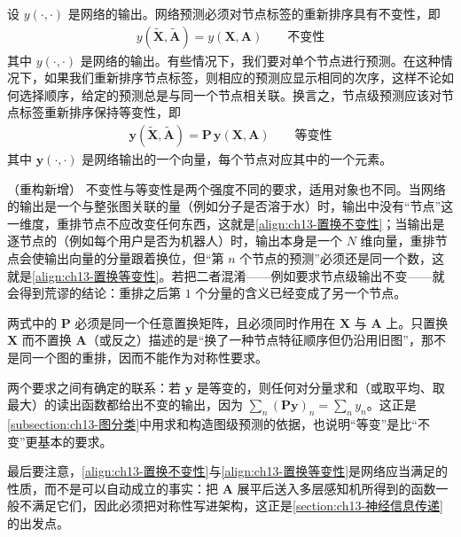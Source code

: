\documentclass[../../main.tex]{subfiles}
\begin{document}
\begin{definition}[置换不变性与置换等变性]\label{definition:ch13-不变性与等变性}
设 $y(\cdot,\cdot)$ 是网络的输出。网络预测必须对节点标签的重新排序具有不变性，即
\begin{align}
y(\widetilde{\bm{X}},\widetilde{\bm{A}})=y(\bm{X},\bm{A})\qquad\text{不变性}
\label{align:ch13-置换不变性}
\end{align}
其中 $y(\cdot,\cdot)$ 是网络的输出。有些情况下，我们要对单个节点进行预测。在这种情况下，如果我们重新排序节点标签，则相应的预测应显示相同的次序，这样不论如何选择顺序，给定的预测总是与同一个节点相关联。换言之，节点级预测应该对节点标签重新排序保持等变性，即
\begin{align}
\bm{y}(\widetilde{\bm{X}},\widetilde{\bm{A}})=\bm{P}\,\bm{y}(\bm{X},\bm{A})\qquad\text{等变性}
\label{align:ch13-置换等变性}
\end{align}
其中 $\bm{y}(\cdot,\cdot)$ 是网络输出的一个向量，每个节点对应其中的一个元素。
\end{definition}

\begin{remark}（重构新增）
不变性与等变性是两个强度不同的要求，适用对象也不同。当网络的输出是一个与整张图关联的量（例如分子是否溶于水）时，输出中没有“节点”这一维度，重排节点不应改变任何东西，这就是\eqref{align:ch13-置换不变性}；当输出是逐节点的（例如每个用户是否为机器人）时，输出本身是一个 $N$ 维向量，重排节点会使输出向量的分量跟着换位，但“第 $n$ 个节点的预测”必须还是同一个数，这就是\eqref{align:ch13-置换等变性}。若把二者混淆——例如要求节点级输出不变——就会得到荒谬的结论：重排之后第 $1$ 个分量的含义已经变成了另一个节点。\par
两式中的 $\bm{P}$ 必须是同一个任意置换矩阵，且必须同时作用在 $\bm{X}$ 与 $\bm{A}$ 上。只置换 $\bm{X}$ 而不置换 $\bm{A}$（或反之）描述的是“换了一种节点特征顺序但仍沿用旧图”，那不是同一个图的重排，因而不能作为对称性要求。\par
两个要求之间有确定的联系：若 $\bm{y}$ 是等变的，则任何对分量求和（或取平均、取最大）的读出函数都给出不变的输出，因为 $\sum_n(\bm{P}\bm{y})_n=\sum_n y_n$。这正是\cref{subsection:ch13-图分类}中用求和构造图级预测的依据，也说明“等变”是比“不变”更基本的要求。\par
最后要注意，\eqref{align:ch13-置换不变性}与\eqref{align:ch13-置换等变性}是网络应当满足的性质，而不是可以自动成立的事实：把 $\bm{A}$ 展平后送入多层感知机所得到的函数一般不满足它们，因此必须把对称性写进架构，这正是\cref{section:ch13-神经信息传递}的出发点。
\end{remark}
\end{document}

